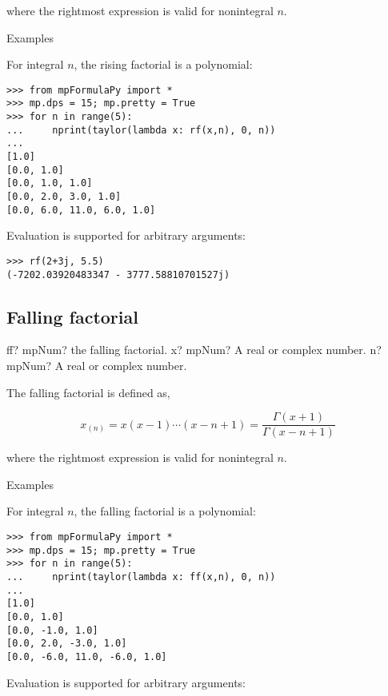 where the rightmost expression is valid for nonintegral $n$.

Examples

For integral $n$, the rising factorial is a polynomial:


\begin{lstlisting}
>>> from mpFormulaPy import *
>>> mp.dps = 15; mp.pretty = True
>>> for n in range(5):
...     nprint(taylor(lambda x: rf(x,n), 0, n))
...
[1.0]
[0.0, 1.0]
[0.0, 1.0, 1.0]
[0.0, 2.0, 3.0, 1.0]
[0.0, 6.0, 11.0, 6.0, 1.0]
\end{lstlisting}

Evaluation is supported for arbitrary arguments:

\begin{lstlisting}
>>> rf(2+3j, 5.5)
(-7202.03920483347 - 3777.58810701527j)
\end{lstlisting}



\subsection{Falling factorial}

\begin{mpFunctionsExtract}
	\mpFunctionTwo
	{ff? mpNum? the falling factorial.}
	{x? mpNum? A real or complex number.}
	{n? mpNum? A real or complex number.}	
\end{mpFunctionsExtract}


The falling factorial is defined as,

\begin{equation}
	x_{(n)} = x(x-1) \cdots (x-n+1) = \frac{\Gamma(x+1)}{\Gamma(x-n+1)}
\end{equation}


where the rightmost expression is valid for nonintegral $n$.

Examples

For integral $n$, the falling factorial is a polynomial:

\begin{lstlisting}
>>> from mpFormulaPy import *
>>> mp.dps = 15; mp.pretty = True
>>> for n in range(5):
...     nprint(taylor(lambda x: ff(x,n), 0, n))
...
[1.0]
[0.0, 1.0]
[0.0, -1.0, 1.0]
[0.0, 2.0, -3.0, 1.0]
[0.0, -6.0, 11.0, -6.0, 1.0]
\end{lstlisting}

Evaluation is supported for arbitrary arguments:


